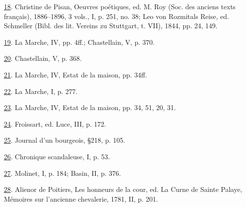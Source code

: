 \protect\hypertarget{23_NOTES.xhtmlux5cux23id_2052}{\protect\hyperlink{09_Chapter_Two__THE_CRAVING_FOR_A_M.xhtmlux5cux23id_2051}{18}}.
Christine de Pisan, Oeuvres poétiques, ed. M. Roy (Soc. des anciens
texts français), 1886--1896, 3 vols., I, p. 251, no. 38; Leo von
Rozmitals Reise, ed. Schmeller (Bibl. des lit. Vereins zu Stuttgart, t.
VII), 1844, pp. 24, 149.

\protect\hypertarget{23_NOTES.xhtmlux5cux23id_2050}{\protect\hyperlink{09_Chapter_Two__THE_CRAVING_FOR_A_M.xhtmlux5cux23id_2049}{19}}.
La Marche, IV, pp. 4ff.; Chastellain, V, p. 370.

\protect\hypertarget{23_NOTES.xhtmlux5cux23id_2048}{\protect\hyperlink{09_Chapter_Two__THE_CRAVING_FOR_A_M.xhtmlux5cux23id_2047}{20}}.
Chastellain, V, p. 368.

\protect\hypertarget{23_NOTES.xhtmlux5cux23id_2046}{\protect\hyperlink{09_Chapter_Two__THE_CRAVING_FOR_A_M.xhtmlux5cux23id_2045}{21}}.
La Marche, IV, Estat de la maison, pp. 34ff.

\protect\hypertarget{23_NOTES.xhtmlux5cux23id_2044}{\protect\hyperlink{09_Chapter_Two__THE_CRAVING_FOR_A_M.xhtmlux5cux23id_2043}{22}}.
La Marche, I, p. 277.

\protect\hypertarget{23_NOTES.xhtmlux5cux23id_2042}{\protect\hyperlink{09_Chapter_Two__THE_CRAVING_FOR_A_M.xhtmlux5cux23id_2041}{23}}.
La Marche, IV, Estat de la maison, pp. 34, 51, 20, 31.

\protect\hypertarget{23_NOTES.xhtmlux5cux23id_2040}{\protect\hyperlink{09_Chapter_Two__THE_CRAVING_FOR_A_M.xhtmlux5cux23id_2039}{24}}.
Froissart, ed. Luce, III, p. 172.

\protect\hypertarget{23_NOTES.xhtmlux5cux23id_2038}{\protect\hyperlink{09_Chapter_Two__THE_CRAVING_FOR_A_M.xhtmlux5cux23id_2037}{25}}.
Journal d'un bourgeois, §218, p. 105.

\protect\hypertarget{23_NOTES.xhtmlux5cux23id_2036}{\protect\hyperlink{09_Chapter_Two__THE_CRAVING_FOR_A_M.xhtmlux5cux23id_2035}{26}}.
Chronique scandaleuse, I, p. 53.

\protect\hypertarget{23_NOTES.xhtmlux5cux23id_2034}{\protect\hyperlink{09_Chapter_Two__THE_CRAVING_FOR_A_M.xhtmlux5cux23id_2033}{27}}.
Molinet, I, p. 184; Basin, II, p. 376.

\protect\hypertarget{23_NOTES.xhtmlux5cux23id_2032}{\protect\hyperlink{09_Chapter_Two__THE_CRAVING_FOR_A_M.xhtmlux5cux23id_2031}{28}}.
Alienor de Poitiers, Les honneurs de la cour, ed. La Curne de Sainte
Palaye, Mémoires sur l'ancienne chevalerie, 1781, II, p. 201.

